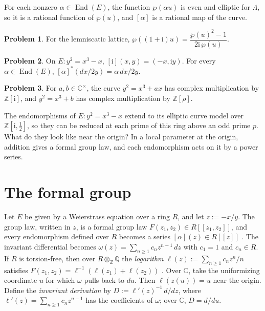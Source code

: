 \documentclass[reqno]{amsart}
\theoremstyle{definition}
\newtheorem{problem}{Problem}[section]
\theoremstyle{plain}
\newcommand{\Z}{\mathbb{Z}}
\newcommand{\Q}{\mathbb{Q}}
\newcommand{\C}{\mathbb{C}}
\newcommand{\ii}{\mathrm{i}}
\newcommand{\End}{\operatorname{End}}
\begin{document}
For each nonzero \(\alpha\in\End(E)\), the function \(\wp(\alpha u)\) is even and elliptic for \(\Lambda\), so it is a rational function of \(\wp(u)\), and \([\alpha]\) is a rational map of the curve.

\begin{problem}\label{pr:one-plus-i}
For the lemniscatic lattice, \(\wp((1+\ii)u) = \dfrac{\wp(u)^2 - 1}{2\ii\, \wp(u)}\).
\end{problem}

\begin{problem}\label{pr:i-action}
On \(E \colon y^2 = x^3 - x\), \([\ii](x, y) = (-x, \ii y)\).  For every \(\alpha \in \End(E)\), \([\alpha]^*(dx/2y) = \alpha\, dx/2y\).
\end{problem}

\begin{problem}\label{pr:j1728}
For \(a, b \in \C^\times\), the curve \(y^2 = x^3 + ax\) has complex multiplication by \(\Z[\ii]\), and \(y^2 = x^3 + b\) has complex multiplication by \(\Z[\rho]\).
\end{problem}

The endomorphisms of \(E \colon y^2 = x^3 - x\) extend to its elliptic curve model over \(\Z[\ii,\tfrac12]\), so they can be reduced at each prime of this ring above an odd prime \(p\).  What do they look like near the origin?  In a local parameter at the origin, addition gives a formal group law, and each endomorphism acts on it by a power series.

\section{The formal group}\label{sec:formal}

Let \(E\) be given by a Weierstrass equation over a ring \(R\), and let \(z := -x/y\).  The group law, written in \(z\), is a formal group law \(F(z_1, z_2) \in R[[z_1, z_2]]\), and every endomorphism defined over \(R\) becomes a series \([\alpha](z) \in R[[z]]\) \cite[\S\S IV.1--IV.2]{Si1}.  The invariant differential becomes \(\omega(z) = \sum_{n \ge 1} c_n z^{n-1}\, d z\) with \(c_1 = 1\) and \(c_n \in R\).  If \(R\) is torsion-free, then over \(R \otimes_\Z \Q\) the \emph{logarithm} \(\ell(z) := \sum_{n \ge 1} c_n z^n/n\) satisfies \(F(z_1, z_2) = \ell^{-1}(\ell(z_1) + \ell(z_2))\) \cite[\S\S IV.4--IV.5]{Si1}.  Over \(\C\), take the uniformizing coordinate \(u\) for which \(\omega\) pulls back to \(d u\).  Then \(\ell(z(u)) = u\) near the origin.  Define the \emph{invariant derivation} by \(D := \ell'(z)^{-1}\, d/dz\), where \(\ell'(z) = \sum_{n \ge 1} c_n z^{n-1}\) has the coefficients of \(\omega\); over \(\C\), \(D = d/du\).
\end{document}
